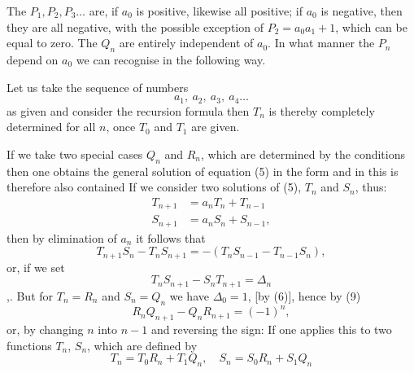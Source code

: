 
The $P_1, P_2, P_3 \ldots$ are, if $a_0$ is positive, likewise all positive; if $a_0$ is negative, then they are all negative, with the possible exception of $P_2 = a_0 a_1 + 1$, which can be equal to zero. The $Q_n$ are entirely independent of $a_0$. In what manner the $P_n$ depend on $a_0$ we can recognise in the following way.

Let us take the sequence of numbers
\[
a_1, \ a_2, \ a_3, \ a_4 \ldots
\]
as given and consider the recursion formula
then $T_n$ is thereby completely determined for all $n$, once $T_0$ and $T_1$ are given.

If we take two special cases $Q_n$ and $R_n$, which are determined by the conditions
then one obtains the general solution of equation (5) in the form
and in this is therefore also contained
If we consider two solutions of (5), $T_n$ and $S_n$, thus:
\[
\begin{aligned}
T_{n+1} &= a_n T_n + T_{n-1} \\
S_{n+1} &= a_n S_n + S_{n-1},
\end{aligned}
\]
then by elimination of $a_n$ it follows that
\[
T_{n+1} S_n - T_n S_{n+1} = -(T_n S_{n-1} - T_{n-1} S_n),
\]
or, if we set
\[
T_n S_{n+1} - S_n T_{n+1} = \varDelta_n
\]
,. %
But for $T_n = R_n$ and $S_n = Q_n$ we have $\varDelta_0 = 1$, [by (6)], hence by (9)
\[
R_n Q_{n+1} - Q_n R_{n+1} = (-1)^n,
\]
or, by changing $n$ into $n-1$ and reversing the sign:
If one applies this to two functions $T_n$, $S_n$, which are defined by
\[
T_n = T_0 R_n + T_1 Q_n, \quad S_n = S_0 R_n + S_1 Q_n
\]
